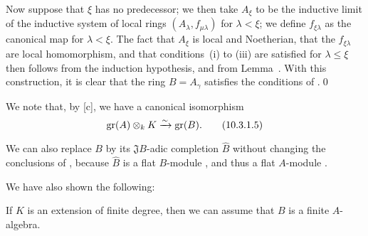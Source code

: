 \begin{env}[10.3.1.4]
Now suppose that $\xi$ has no predecessor;
we then take $A_\xi$ to be the inductive limit of the inductive system of local rings $(A_\lambda,f_{\mu\lambda})$ for $\lambda<\xi$;
we define $f_{\xi\lambda}$ as the canonical map for $\lambda<\xi$.
The fact that $A_\xi$ is local and Noetherian, that the $f_{\xi\lambda}$ are local homomorphism, and that conditions~(i) to (iii) are satisfied for $\lambda\leq\xi$
then follows from the induction hypothesis, and from Lemma~.
With this construction, it is clear that the ring $B=A_\gamma$ satisfies the conditions of .\qed
\end{env}

We note that, by [c], we have a canonical isomorphism
\[
\label{eq:0.10.3.1.5}
  \operatorname{gr}(A)\otimes_k K\xrightarrow{\sim}\operatorname{gr}(B).
  \tag{10.3.1.5}
\]

We can also replace $B$ by its $\mathfrak{J}B$-adic completion $\widehat{B}$ without changing the conclusions of , because $\widehat{B}$ is a flat $B$-module , and thus a flat $A$-module .

We have also shown the following:
\begin{corollary}[10.3.2]
\label{0.10.3.2}
If $K$ is an extension of finite degree, then we can assume that $B$ is a finite $A$-algebra.
\end{corollary}

